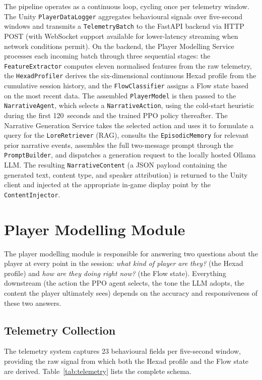 The pipeline operates as a continuous loop, cycling once per telemetry window. The Unity \texttt{PlayerDataLogger} aggregates behavioural signals over five-second windows and transmits a \texttt{TelemetryBatch} to the FastAPI backend via HTTP POST (with WebSocket support available for lower-latency streaming when network conditions permit). On the backend, the Player Modelling Service processes each incoming batch through three sequential stages: the \texttt{FeatureExtractor} computes eleven normalised features from the raw telemetry, the \texttt{HexadProfiler} derives the six-dimensional continuous Hexad profile from the cumulative session history, and the \texttt{FlowClassifier} assigns a Flow state based on the most recent data. The assembled \texttt{PlayerModel} is then passed to the \texttt{NarrativeAgent}, which selects a \texttt{NarrativeAction}, using the cold-start heuristic during the first 120~seconds and the trained PPO policy thereafter. The Narrative Generation Service takes the selected action and uses it to formulate a query for the \texttt{LoreRetriever} (RAG), consults the \texttt{EpisodicMemory} for relevant prior narrative events, assembles the full two-message prompt through the \texttt{PromptBuilder}, and dispatches a generation request to the locally hosted Ollama LLM. The resulting \texttt{NarrativeContent} (a JSON payload containing the generated text, content type, and speaker attribution) is returned to the Unity client and injected at the appropriate in-game display point by the \texttt{ContentInjector}.

\section{Player Modelling Module}

The player modelling module is responsible for answering two questions about the player at every point in the session: \textit{what kind of player are they?} (the Hexad profile) and \textit{how are they doing right now?} (the Flow state). Everything downstream (the action the PPO agent selects, the tone the LLM adopts, the content the player ultimately sees) depends on the accuracy and responsiveness of these two answers.

\subsection{Telemetry Collection}

The telemetry system captures 23 behavioural fields per five-second window, providing the raw signal from which both the Hexad profile and the Flow state are derived. Table~\ref{tab:telemetry} lists the complete schema.


